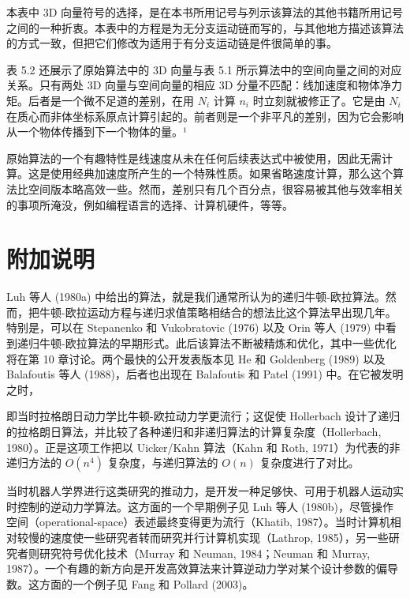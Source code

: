 \documentclass[10pt,a4paper]{book}
\theoremstyle{thmstyle} %
\theoremstyle{defstyle} %
\theoremstyle{prostyle} %
\begin{document}
本表中 3D 向量符号的选择，是在本书所用记号与列示该算法的其他书籍所用记号之间的一种折衷。本表中的方程是为无分支运动链而写的，与其他地方描述该算法的方式一致，但把它们修改为适用于有分支运动链是件很简单的事。



表 5.2 还展示了原始算法中的 3D 向量与表 5.1 所示算法中的空间向量之间的对应关系。只有两处 3D 向量与空间向量的相应 3D 分量不匹配：线加速度和物体净力矩。后者是一个微不足道的差别，在用 $N_{i}$ 计算 $n_{i}$ 时立刻就被修正了。它是由 $N_{i}$ 在质心而非体坐标系原点计算引起的。前者则是一个非平凡的差别，因为它会影响从一个物体传播到下一个物体的量。¹



原始算法的一个有趣特性是线速度从未在任何后续表达式中被使用，因此无需计算。这是使用经典加速度所产生的一个特殊性质。如果省略速度计算，那么这个算法比空间版本略高效一些。然而，差别只有几个百分点，很容易被其他与效率相关的事项所淹没，例如编程语言的选择、计算机硬件，等等。



\section{附加说明}





Luh 等人 (1980a) 中给出的算法，就是我们通常所认为的递归牛顿-欧拉算法。然而，把牛顿-欧拉运动方程与递归求值策略相结合的想法比这个算法早出现几年。特别是，可以在 Stepanenko 和 Vukobratovic (1976) 以及 Orin 等人 (1979) 中看到递归牛顿-欧拉算法的早期形式。此后该算法不断被精炼和优化，其中一些优化将在第 10 章讨论。两个最快的公开发表版本见 He 和 Goldenberg (1989) 以及 Balafoutis 等人 (1988)，后者也出现在 Balafoutis 和 Patel (1991) 中。在它被发明之时，



即当时拉格朗日动力学比牛顿-欧拉动力学更流行；这促使 Hollerbach 设计了递归的拉格朗日算法，并比较了各种递归和非递归算法的计算复杂度（Hollerbach, 1980）。正是这项工作把以 Uicker/Kahn 算法（Kahn 和 Roth, 1971）为代表的非递归方法的 $O(n^4)$ 复杂度，与递归算法的 $O(n)$ 复杂度进行了对比。



当时机器人学界进行这类研究的推动力，是开发一种足够快、可用于机器人运动实时控制的逆动力学算法。这方面的一个早期例子见 Luh 等人 (1980b)，尽管操作空间（operational-space）表述最终变得更为流行（Khatib, 1987）。当时计算机相对较慢的速度使一些研究者转而研究并行计算机实现（Lathrop, 1985），另一些研究者则研究符号优化技术（Murray 和 Neuman, 1984；Neuman 和 Murray, 1987）。一个有趣的新方向是开发高效算法来计算逆动力学对某个设计参数的偏导数。这方面的一个例子见 Fang 和 Pollard (2003)。
\end{document}
